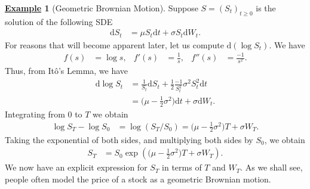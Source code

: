 \documentclass[12pt]{book}
\numberwithin{equation}{chapter}
\theoremstyle{plain}
\numberwithin{theorem}{section}
\theoremstyle{definition}
\newtheorem{example}[theorem]{\underline{Example}}
\numberwithin{exercise}{chapter}
\newcommand{\<}{\langle}
\renewcommand{\>}{\rangle}
\renewcommand{\(}{\left(}
\renewcommand{\)}{\right)}
\renewcommand{\[}{\left[}
\renewcommand{\]}{\right]}
\newcommand\sig{\sigma}
\newcommand\dd{\mathrm{d}}
\theoremstyle{definition}
\numberwithin{question}{section}
\begin{document}
\begin{example}[Geometric Brownian Motion]
\label{ex:gbm}
Suppose $S = (S_t)_{t \geq 0}$ is the solution of the following SDE
\begin{align}
\dd S_t
	&=	\mu S_t \dd t + \sig S_t \dd W_t .
\end{align}
For reasons that will become apparent later, let us compute $\dd (\log S_t)$.  We have
\begin{align}
f(s) 
	&=	\log s , &
f'(s)
	&=	\frac{1}{s} , &
f''(s)
	&=	\frac{-1}{s^2} .
\end{align}
Thus, from It\^o's Lemma, we have
\begin{align}
\dd \log S_t
	&=	\frac{1}{S_t} \dd S_t + \frac{1}{2} \frac{-1}{S_t^2} \sig^2 S_t^2 \dd t \\
	&=	\Big( \mu - \frac{1}{2} \sig^2 \Big) \dd t + \sig \dd W_t .
\end{align}
Integrating from $0$ to $T$ we obtain
\begin{align}
\log S_T - \log S_0
	&=	\log(S_T/S_0)
	=		\Big( \mu - \frac{1}{2} \sig^2 \Big) T + \sig W_T  .
\end{align}
Taking the exponential of both sides, and multiplying both sides by $S_0$, we obtain
\begin{align}
S_T
	&=	S_0 \exp \( \Big( \mu - \frac{1}{2} \sig^2 \Big) T + \sig W_T \) .
\end{align}
We now have an explicit expression for $S_T$ in terms of $T$ and $W_T$.
As we shall see, people often model the price of a stock as a geometric Brownian motion.
\end{example}
\end{document}
